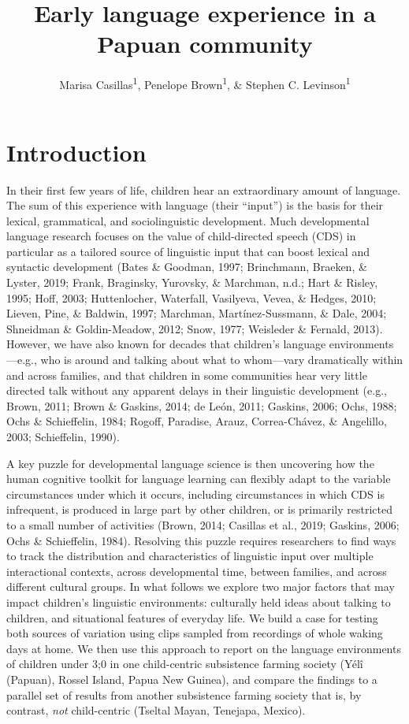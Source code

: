 \documentclass[
  english,
  ,man,floatsintext]{apa6}
\title{Early language experience in a Papuan community}
\author{Marisa Casillas\textsuperscript{1}, Penelope Brown\textsuperscript{1}, \& Stephen C. Levinson\textsuperscript{1}}
\date{}
\begin{document}
\maketitle

\hypertarget{intro}{%
\section{Introduction}\label{intro}}

In their first few years of life, children hear an extraordinary amount of language. The sum of this experience with language (their \enquote{input}) is the basis for their lexical, grammatical, and sociolinguistic development. Much developmental language research focuses on the value of child-directed speech (CDS) in particular as a tailored source of linguistic input that can boost lexical and syntactic development (Bates \& Goodman, 1997; Brinchmann, Braeken, \& Lyster, 2019; Frank, Braginsky, Yurovsky, \& Marchman, n.d.; Hart \& Risley, 1995; Hoff, 2003; Huttenlocher, Waterfall, Vasilyeva, Vevea, \& Hedges, 2010; Lieven, Pine, \& Baldwin, 1997; Marchman, Martínez-Sussmann, \& Dale, 2004; Shneidman \& Goldin-Meadow, 2012; Snow, 1977; Weisleder \& Fernald, 2013). However, we have also known for decades that children's language environments---e.g., who is around and talking about what to whom---vary dramatically within and across families, and that children in some communities hear very little directed talk without any apparent delays in their linguistic development (e.g., Brown, 2011; Brown \& Gaskins, 2014; de León, 2011; Gaskins, 2006; Ochs, 1988; Ochs \& Schieffelin, 1984; Rogoff, Paradise, Arauz, Correa-Chávez, \& Angelillo, 2003; Schieffelin, 1990).

A key puzzle for developmental language science is then uncovering how the human cognitive toolkit for language learning can flexibly adapt to the variable circumstances under which it occurs, including circumstances in which CDS is infrequent, is produced in large part by other children, or is primarily restricted to a small number of activities (Brown, 2014; Casillas et al., 2019; Gaskins, 2006; Ochs \& Schieffelin, 1984). Resolving this puzzle requires researchers to find ways to track the distribution and characteristics of linguistic input over multiple interactional contexts, across developmental time, between families, and across different cultural groups. In what follows we explore two major factors that may impact children's linguistic environments: culturally held ideas about talking to children, and situational features of everyday life. We build a case for testing both sources of variation using clips sampled from recordings of whole waking days at home. We then use this approach to report on the language environments of children under 3;0 in one child-centric subsistence farming society (Yélî (Papuan), Rossel Island, Papua New Guinea), and compare the findings to a parallel set of results from another subsistence farming society that is, by contrast, \emph{not} child-centric (Tseltal Mayan, Tenejapa, Mexico).
\end{document}
